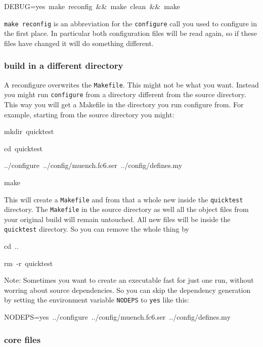 \begin{lyxcode}
DEBUG=yes~make~reconfig~\&\&~make~clean~\&\&~make
\end{lyxcode}
\texttt{make reconfig} is an abbreviation for the \texttt{configure}
call you used to configure in the first place. In particular both
configuration files will be read again, so if these files have changed
it will do something different.


\subsubsection{build in a different directory}

A \ccarat{} reconfigure overwrites the \texttt{Makefile}. This might
not be what you want. Instead you might run \texttt{configure} from
a directory different from the \ccarat{} source directory. This way
you will get a Makefile in the directory you run configure from. For
example, starting from the \ccarat{} source directory you might:

\begin{lyxcode}
mkdir~quicktest

cd~quicktest

../configure~../config/muench.fc6.ser~../config/defines.my

make
\end{lyxcode}
This will create a \texttt{Makefile} and from that a whole new \ccarat{}
inside the \texttt{quicktest} directory. The \texttt{Makefile} in
the source directory as well all the object files from your original
build will remain untouched. All new files will be inside the \texttt{quicktest}
directory. So you can remove the whole thing by

\begin{lyxcode}
cd~..

rm~-r~quicktest
\end{lyxcode}
Note: Sometimes you want to create an executable fast for just one
run, without worring about source dependencies. So you can skip the
dependency generation by setting the environment variable \texttt{NODEPS}
to \texttt{yes} like this:

\begin{lyxcode}
NODEPS=yes~../configure~../config/muench.fc6.ser~../config/defines.my
\end{lyxcode}

\subsubsection{core files}

